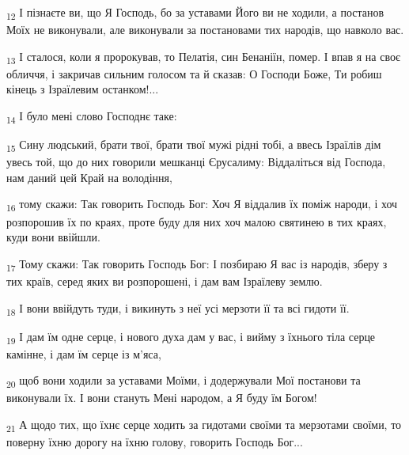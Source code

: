 \begin{tcolorbox}
\textsubscript{12} І пізнаєте ви, що Я Господь, бо за уставами Його ви не ходили, а постанов Моїх не виконували, але виконували за постановами тих народів, що навколо вас.
\end{tcolorbox}
\begin{tcolorbox}
\textsubscript{13} І сталося, коли я пророкував, то Пелатія, син Бенаніїн, помер. І впав я на своє обличчя, і закричав сильним голосом та й сказав: О Господи Боже, Ти робиш кінець з Ізраїлевим останком!...
\end{tcolorbox}
\begin{tcolorbox}
\textsubscript{14} І було мені слово Господнє таке:
\end{tcolorbox}
\begin{tcolorbox}
\textsubscript{15} Сину людський, брати твої, брати твої мужі рідні тобі, а ввесь Ізраїлів дім увесь той, що до них говорили мешканці Єрусалиму: Віддаліться від Господа, нам даний цей Край на володіння,
\end{tcolorbox}
\begin{tcolorbox}
\textsubscript{16} тому скажи: Так говорить Господь Бог: Хоч Я віддалив їх поміж народи, і хоч розпорошив їх по краях, проте буду для них хоч малою святинею в тих краях, куди вони ввійшли.
\end{tcolorbox}
\begin{tcolorbox}
\textsubscript{17} Тому скажи: Так говорить Господь Бог: І позбираю Я вас із народів, зберу з тих країв, серед яких ви розпорошені, і дам вам Ізраїлеву землю.
\end{tcolorbox}
\begin{tcolorbox}
\textsubscript{18} І вони ввійдуть туди, і викинуть з неї усі мерзоти її та всі гидоти її.
\end{tcolorbox}
\begin{tcolorbox}
\textsubscript{19} І дам їм одне серце, і нового духа дам у вас, і вийму з їхнього тіла серце камінне, і дам їм серце із м'яса,
\end{tcolorbox}
\begin{tcolorbox}
\textsubscript{20} щоб вони ходили за уставами Моїми, і додержували Мої постанови та виконували їх. І вони стануть Мені народом, а Я буду їм Богом!
\end{tcolorbox}
\begin{tcolorbox}
\textsubscript{21} А щодо тих, що їхнє серце ходить за гидотами своїми та мерзотами своїми, то поверну їхню дорогу на їхню голову, говорить Господь Бог...
\end{tcolorbox}
